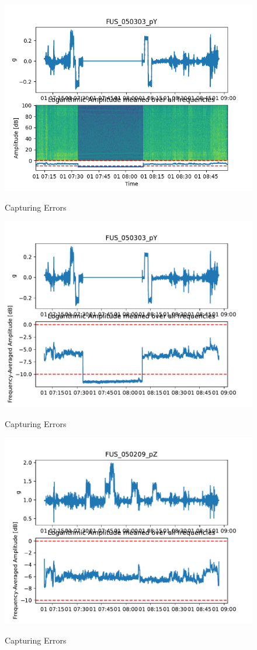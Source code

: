 \begin{figure}
    \centering
    \includegraphics[width=.7\textwidth]{03_figures/python_functions/images/FUS_050303_spectro.png}
    \label{fig:res_050303_spectrogram}
    \caption{Capturing Errors}
\end{figure}



\begin{figure}
    \centering
    \includegraphics[width=.7\textwidth]{03_figures/python_functions/images/FUS_050303}
    \label{fig:res_050303}
    \caption{Capturing Errors}
\end{figure}

\begin{figure}
    \centering
    \includegraphics[width=.7\textwidth]{03_figures/python_functions/images/FUS_050209}
    \label{fig:res_050209}
    \caption{Capturing Errors}
\end{figure}







